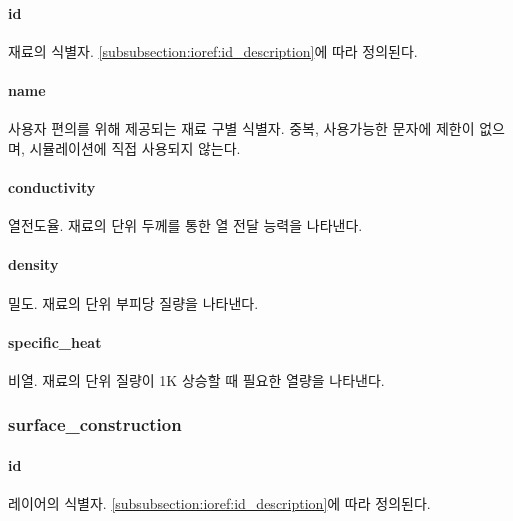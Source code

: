 
\paragraph{id} 재료의 식별자. \ref{subsubsection:ioref:id_description}에 따라 정의된다.

\paragraph{name} 사용자 편의를 위해 제공되는 재료 구별 식별자. 중복, 사용가능한 문자에 제한이 없으며, 시뮬레이션에 직접 사용되지 않는다.

\paragraph{conductivity} 열전도율. 재료의 단위 두께를 통한 열 전달 능력을 나타낸다.

\paragraph{density} 밀도. 재료의 단위 부피당 질량을 나타낸다.

\paragraph{specific\_heat} 비열. 재료의 단위 질량이 1K 상승할 때 필요한 열량을 나타낸다.

\subsubsection{surface\_construction} \label{subsubsection:ioref:construction}

 
\paragraph{id} 레이어의 식별자. \ref{subsubsection:ioref:id_description}에 따라 정의된다.

